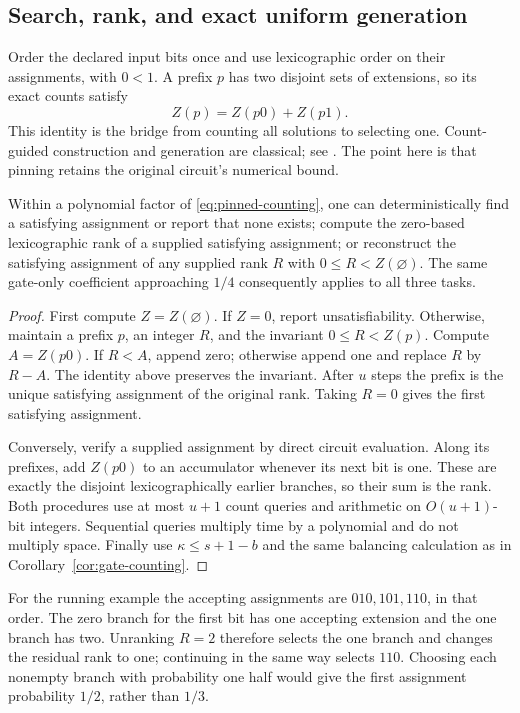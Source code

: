 \subsection{Search, rank, and exact uniform generation}

Order the declared input bits once and use lexicographic order on
their assignments, with $0<1$. A prefix $p$ has two disjoint sets
of extensions, so its exact counts satisfy
\[
 Z(p)=Z(p0)+Z(p1).
\]
This identity is the bridge from counting all solutions to selecting
one. Count-guided construction and generation are classical; see
\citet[Theorem 3.3 and the discussion of fair coins in Section 2]
{JerrumValiantVazirani1986}. The point here is that pinning retains
the original circuit's numerical bound.

\begin{corollary}
\label{cor:search-unrank}
Within a polynomial factor of \eqref{eq:pinned-counting}, one can
deterministically find a satisfying assignment or report that none
exists; compute the zero-based lexicographic rank of a supplied
satisfying assignment; or reconstruct the satisfying assignment of
any supplied rank $R$ with $0\le R<Z(\varnothing)$.
The same gate-only coefficient approaching $1/4$ consequently
applies to all three tasks.
\end{corollary}
\begin{proof}
First compute $Z=Z(\varnothing)$. If $Z=0$, report unsatisfiability.
Otherwise, maintain a prefix $p$, an integer $R$, and the invariant
$0\le R<Z(p)$. Compute $A=Z(p0)$. If $R<A$, append zero; otherwise
append one and replace $R$ by $R-A$. The identity above preserves
the invariant. After $u$ steps the prefix is the unique satisfying
assignment of the original rank. Taking $R=0$ gives the first
satisfying assignment.

Conversely, verify a supplied assignment by direct circuit evaluation.
Along its prefixes, add $Z(p0)$ to an accumulator whenever its next
bit is one. These are exactly the disjoint lexicographically earlier
branches, so their sum is the rank. Both procedures use at most $u+1$
count queries and arithmetic on $O(u+1)$-bit integers. Sequential
queries multiply time by a polynomial and do not multiply space.
Finally use $\kappa\le s+1-b$ and the same balancing calculation
as in Corollary~\ref{cor:gate-counting}.
\end{proof}

For the running example the accepting assignments are
$010,101,110$, in that order. The zero branch for the first bit has
one accepting extension and the one branch has two. Unranking $R=2$
therefore selects the one branch and changes the residual rank to
one; continuing in the same way selects $110$. Choosing each
nonempty branch with probability one half would give the first
assignment probability $1/2$, rather than $1/3$.

